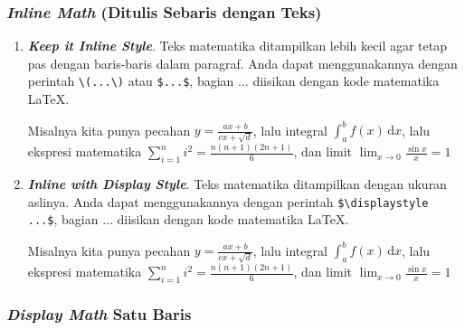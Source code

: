 \subsubsection{\textit{Inline Math} (Ditulis Sebaris dengan Teks)}

\begin{enumerate}[label=\alph*.]
    \item \textbf{\textit{Keep it Inline Style}}. Teks matematika ditampilkan lebih kecil agar tetap pas dengan baris-baris dalam paragraf. Anda dapat menggunakannya dengan perintah \verb|\(...\)| atau \verb|$...$|, bagian $\dots$ diisikan dengan kode matematika \LaTeX.
    
    Misalnya kita punya pecahan $y = \frac{ax + b}{cx + \sqrt{d}}$, lalu integral $\int_{a}^{b} f(x) \,\mathrm{d}x$, lalu ekspresi matematika $\sum_{i=1}^{n} i^2 = \frac{n(n+1)(2n+1)}{6}$, dan limit $\lim_{x \to 0} \frac{\sin x}{x} = 1$
    
    \item \textbf{\textit{Inline with Display Style}}. Teks matematika ditampilkan dengan ukuran aslinya. Anda dapat menggunakannya dengan perintah \verb|$\displaystyle ...$|, bagian $\dots$ diisikan dengan kode matematika \LaTeX.
    
    Misalnya kita punya pecahan $\displaystyle y = \frac{ax + b}{cx + \sqrt{d}}$, lalu integral $\displaystyle \int_{a}^{b} f(x) \,\mathrm{d}x$, lalu ekspresi matematika $\displaystyle \sum_{i=1}^{n} i^2 = \frac{n(n+1)(2n+1)}{6}$, dan limit $\displaystyle \lim_{x \to 0} \frac{\sin x}{x} = 1$
\end{enumerate}

\subsubsection{\textit{Display Math} Satu Baris}

